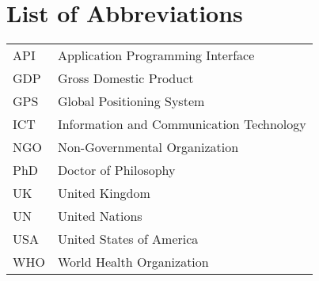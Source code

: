 
\chapter*{List of Abbreviations}
\thispagestyle{plain}

{
\begin{tabular}{ll}
API & Application Programming Interface \\
GDP & Gross Domestic Product \\
GPS & Global Positioning System \\
ICT & Information and Communication Technology \\
NGO & Non-Governmental Organization \\
PhD & Doctor of Philosophy \\
UK & United Kingdom \\
UN & United Nations \\
USA & United States of America \\
WHO & World Health Organization \\
\end{tabular}
}


